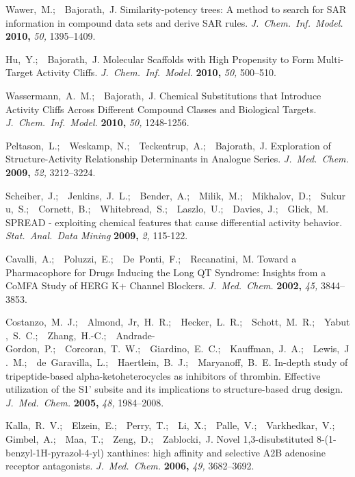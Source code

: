 \documentclass[letterpaper, 12pt]{article}
\begin{document}
\begin{thebibliography}{10}
Wawer,~M.;\ \ Bajorath,~J.  Similarity-potency trees: {A} method to search for
  {SAR} information in compound data sets and derive {SAR} rules.
  \textit{J.~Chem.~Inf.~Model.} \textbf{2010,} \textsl{50,} 1395--1409.

Hu,~Y.;\ \ Bajorath,~J.  Molecular Scaffolds with High Propensity to Form
  Multi-Target Activity Cliffs.  \textit{J.~Chem.~Inf.~Model.} \textbf{2010,}
  \textsl{50,} 500--510.

Wassermann,~A.~M.;\ \ Bajorath,~J.  Chemical Substitutions that Introduce
  Activity Cliffs Across Different Compound Classes and Biological Targets.
  \textit{J.~Chem.~Inf.~Model.} \textbf{2010,} \textsl{50,} 1248-1256.

Peltason,~L.;\ \ Weskamp,~N.;\ \ Teckentrup,~A.;\ \ Bajorath,~J.  Exploration
  of Structure-Activity Relationship Determinants in Analogue Series.
  \textit{J.~Med.~Chem.} \textbf{2009,} \textsl{52,} 3212--3224.

Scheiber,~J.;\ \ Jenkins,~J.~L.;\ \ Bender,~A.;\ \ Milik,~M.;\ \ Mikhalov,~D.;\
  \ Sukuru,~S.;\ \ Cornett,~B.;\ \ Whitebread,~S.;\ \ Laszlo,~U.;\ \
  Davies,~J.;\ \ Glick,~M.  {SPREAD} - exploiting chemical features that cause
  differential activity behavior.  \textit{Stat.~Anal.~Data Mining}
  \textbf{2009,} \textsl{2,} 115-122.

Cavalli,~A.;\ \ Poluzzi,~E.;\ \ De~Ponti,~F.;\ \ Recanatini,~M.  Toward a
  Pharmacophore for Drugs Inducing the Long {QT} Syndrome: Insights from a
  {CoMFA} Study of {HERG K+} Channel Blockers.  \textit{J.~Med.~Chem.}
  \textbf{2002,} \textsl{45,} 3844--3853.

Costanzo,~M.~J.;\ \ Almond,~Jr,~H.~R.;\ \ Hecker,~L.~R.;\ \ Schott,~M.~R.;\ \
  Yabut,~S.~C.;\ \ Zhang,~H.-C.;\ \ Andrade-Gordon,~P.;\ \ Corcoran,~T.~W.;\ \
  Giardino,~E.~C.;\ \ Kauffman,~J.~A.;\ \ Lewis,~J.~M.;\ \ de~Garavilla,~L.;\ \
  Haertlein,~B.~J.;\ \ Maryanoff,~B.~E.  In-depth study of tripeptide-based
  alpha-ketoheterocycles as inhibitors of thrombin. {E}ffective utilization of
  the {S1'} subsite and its implications to structure-based drug design.
  \textit{J.~Med.~Chem.} \textbf{2005,} \textsl{48,} 1984--2008.

\bibitem{Kalla:2006kx}
Kalla,~R.~V.;\ \ Elzein,~E.;\ \ Perry,~T.;\ \ Li,~X.;\ \ Palle,~V.;\ \
  Varkhedkar,~V.;\ \ Gimbel,~A.;\ \ Maa,~T.;\ \ Zeng,~D.;\ \ Zablocki,~J.
  Novel 1,3-disubstituted 8-(1-benzyl-1H-pyrazol-4-yl) xanthines: high affinity
  and selective A2B adenosine receptor antagonists.  \textit{J.~Med.~Chem.}
  \textbf{2006,} \textsl{49,} 3682--3692.


\end{thebibliography}
\end{document}
